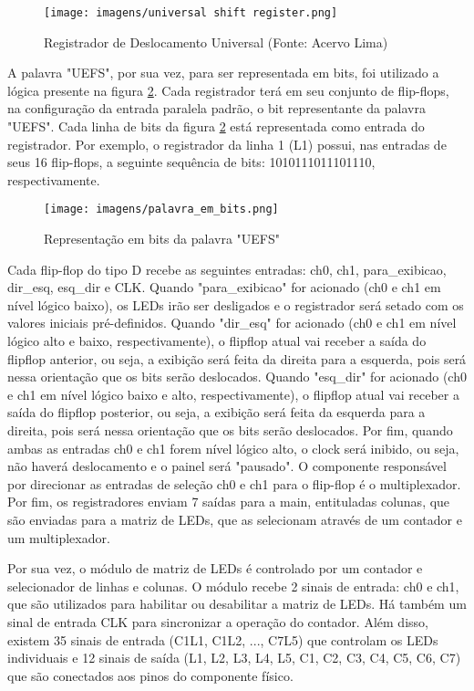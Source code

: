 \begin{figure}[!h]
    \centering
    \texttt{[image: imagens/universal shift register.png]}
    \caption{Registrador de Deslocamento Universal (Fonte: Acervo Lima)}
    \label{fig:universal_sr}
\end{figure}

A palavra "UEFS", por sua vez, para ser representada em bits, foi utilizado a lógica presente na figura \ref{fig:uefs_em_bits}. Cada registrador terá em seu conjunto de flip-flops, na configuração da entrada paralela padrão, o bit representante da palavra "UEFS". Cada linha de bits da figura \ref{fig:uefs_em_bits} está representada como entrada do registrador. Por exemplo, o registrador da linha 1 (L1) possui, nas entradas de seus 16 flip-flops, a seguinte sequência de bits: 1010111011101110, respectivamente. 

\begin{figure}[!h]
    \centering
    \texttt{[image: imagens/palavra\_em\_bits.png]}
    \caption{Representação em bits da palavra "UEFS"}
    \label{fig:uefs_em_bits}
\end{figure}

Cada flip-flop do tipo D recebe as seguintes entradas: ch0, ch1, para\_exibicao, dir\_esq, esq\_dir e CLK. Quando "para\_exibicao" for acionado (ch0 e ch1 em nível lógico baixo), os LEDs irão ser desligados e o registrador será setado com os valores iniciais pré-definidos. Quando "dir\_esq" for acionado (ch0 e ch1 em nível lógico alto e baixo, respectivamente), o flipflop atual vai receber a saída do flipflop anterior, ou seja, a exibição será feita da direita para a esquerda, pois será nessa orientação que os bits serão deslocados. Quando "esq\_dir" for acionado (ch0 e ch1 em nível lógico baixo e alto, respectivamente), o flipflop atual vai receber a saída do flipflop posterior, ou seja, a exibição será feita da esquerda para a direita, pois será nessa orientação que os bits serão deslocados. Por fim, quando ambas as entradas ch0 e ch1 forem nível lógico alto, o clock será inibido, ou seja, não haverá deslocamento e o painel será "pausado". O componente responsável por direcionar as entradas de seleção ch0 e ch1 para o flip-flop é o multiplexador. Por fim, os registradores enviam 7 saídas para a main, entituladas colunas, que são enviadas para a matriz de LEDs, que as selecionam através de um contador e um multiplexador.

Por sua vez, o módulo de matriz de LEDs é controlado por um contador e selecionador de linhas e colunas. O módulo recebe 2 sinais de entrada: ch0 e ch1, que são utilizados para habilitar ou desabilitar a matriz de LEDs. Há também um sinal de entrada CLK para sincronizar a operação do contador. Além disso, existem 35 sinais de entrada (C1L1, C1L2, ..., C7L5) que controlam os LEDs individuais e 12 sinais de saída (L1, L2, L3, L4, L5, C1, C2, C3, C4, C5, C6, C7) que são conectados aos pinos do componente físico.

